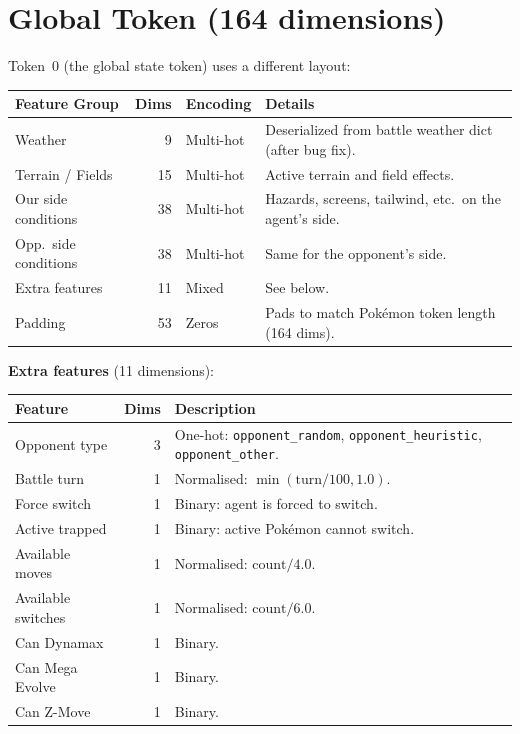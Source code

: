 \section{Global Token (164 dimensions)}

Token~0 (the global state token) uses a different layout:

\begin{center}
\small
\begin{tabularx}{\textwidth}{l r l X}
  \toprule
  \textbf{Feature Group} & \textbf{Dims} & \textbf{Encoding} & \textbf{Details} \\
  \midrule
  Weather           & 9  & Multi-hot &
    Deserialized from battle weather dict (after bug fix). \\
  Terrain / Fields  & 15 & Multi-hot &
    Active terrain and field effects. \\
  Our side conditions  & 38 & Multi-hot &
    Hazards, screens, tailwind, etc.\ on the agent's side. \\
  Opp.\ side conditions & 38 & Multi-hot &
    Same for the opponent's side. \\
  Extra features    & 11 & Mixed &
    See below. \\
  Padding           & 53 & Zeros &
    Pads to match Pok\'{e}mon token length (164 dims). \\
  \bottomrule
\end{tabularx}
\end{center}

\textbf{Extra features} (11 dimensions):

\begin{center}
\small
\begin{tabularx}{\textwidth}{l r X}
  \toprule
  \textbf{Feature} & \textbf{Dims} & \textbf{Description} \\
  \midrule
  Opponent type     & 3  & One-hot: \texttt{opponent\_random},
                           \texttt{opponent\_heuristic},
                           \texttt{opponent\_other}. \\
  Battle turn       & 1  & Normalised: $\min(\text{turn} / 100, 1.0)$. \\
  Force switch      & 1  & Binary: agent is forced to switch. \\
  Active trapped    & 1  & Binary: active Pok\'{e}mon cannot switch. \\
  Available moves   & 1  & Normalised: $\text{count} / 4.0$. \\
  Available switches & 1 & Normalised: $\text{count} / 6.0$. \\
  Can Dynamax       & 1  & Binary. \\
  Can Mega Evolve   & 1  & Binary. \\
  Can Z-Move        & 1  & Binary. \\
  \bottomrule
\end{tabularx}
\end{center}


